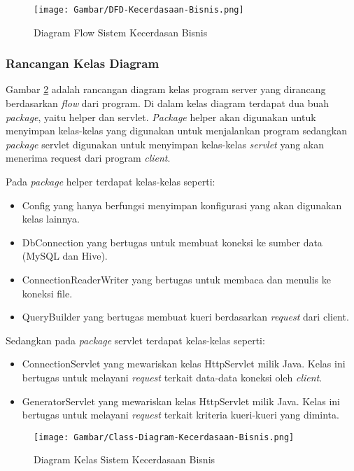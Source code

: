 \begin{figure}[H]
	\centering
	\texttt{[image: Gambar/DFD-Kecerdasaan-Bisnis.png]}
	\caption[Diagram Flow Sistem Kecerdasan Bisnis]{Diagram Flow Sistem Kecerdasan Bisnis} 
	\label{fig:bi_flow}
\end{figure}

\subsubsection{Rancangan Kelas Diagram}
Gambar \ref{fig:bi_kelas} adalah rancangan diagram kelas program server yang dirancang berdasarkan \textit{flow} dari program. Di dalam kelas diagram terdapat dua buah \textit{package}, yaitu helper dan servlet. \textit{Package} helper akan digunakan untuk menyimpan kelas-kelas yang digunakan untuk menjalankan program sedangkan \textit{package} servlet digunakan untuk menyimpan kelas-kelas \textit{servlet} yang akan menerima request dari program \textit{client}.

Pada \textit{package} helper terdapat kelas-kelas seperti:
\begin{itemize}
	\item Config yang hanya berfungsi menyimpan konfigurasi yang akan digunakan kelas lainnya.
	\item DbConnection yang bertugas untuk membuat koneksi ke sumber data (MySQL dan Hive).
	\item ConnectionReaderWriter yang bertugas untuk membaca dan menulis ke koneksi file.
	\item QueryBuilder yang bertugas membuat kueri berdasarkan \textit{request} dari client.
\end{itemize}

Sedangkan pada \textit{package} servlet terdapat kelas-kelas seperti:
\begin{itemize}
	\item ConnectionServlet yang mewariskan kelas HttpServlet milik Java. Kelas ini bertugas untuk melayani \textit{request} terkait data-data koneksi oleh \textit{client}.
	\item GeneratorServlet yang mewariskan kelas HttpServlet milik Java. Kelas ini bertugas untuk melayani \textit{request} terkait kriteria kueri-kueri yang diminta.
\end{itemize}

\begin{figure}[H]
	\centering
	\texttt{[image: Gambar/Class-Diagram-Kecerdasaan-Bisnis.png]}
	\caption[Diagram Kelas Sistem Kecerdasaan Bisnis]{Diagram Kelas Sistem Kecerdasaan Bisnis} 
	\label{fig:bi_kelas}
\end{figure}

